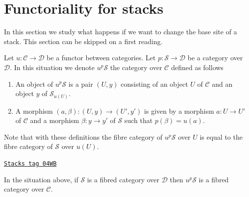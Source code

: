 \section{Functoriality for stacks}
\label{stacks-section-inverse-image}
In this section we study what happens if we want to change the base site
of a stack. This section can be skipped on a first reading.

\medskip\noindent
Let $u : \mathcal{C} \to \mathcal{D}$ be a functor between categories.
Let $p : \mathcal{S} \to \mathcal{D}$ be a category over $\mathcal{D}$.
In this situation we denote $u^p\mathcal{S}$ the category over $\mathcal{C}$
defined as follows
\begin{enumerate}
\item An object of $u^p\mathcal{S}$ is a pair $(U, y)$ consisting
of an object $U$ of $\mathcal{C}$ and an object $y$ of $\mathcal{S}_{u(U)}$.
\item A morphism $(a, \beta) : (U, y) \to (U', y')$ is given by
a morphism $a : U \to U'$ of $\mathcal{C}$ and a morphism $\beta : y \to y'$
of $\mathcal{S}$ such that $p(\beta) = u(a)$.
\end{enumerate}
Note that with these definitions the fibre category of
$u^p\mathcal{S}$ over $U$ is equal to the fibre category of
$\mathcal{S}$ over $u(U)$.

\begin{lemma}
\label{stacks-lemma-fibred-category-pushforward}
\href{https://stacks.math.columbia.edu/tag/04WB}{\texttt{Stacks tag 04WB}}

In the situation above, if $\mathcal{S}$ is a fibred category over
$\mathcal{D}$ then $u^p\mathcal{S}$ is a fibred category over $\mathcal{C}$.
\end{lemma}

